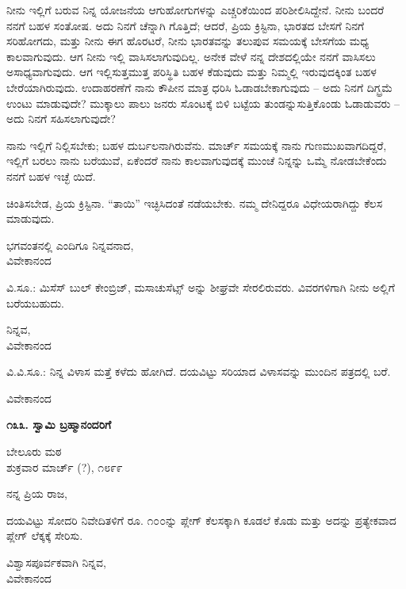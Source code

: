 ನೀನು ಇಲ್ಲಿಗೆ ಬರುವ ನಿನ್ನ ಯೋಜನೆಯ ಆಗುಹೋಗುಗಳನ್ನು ಎಚ್ಚರಿಕೆಯಿಂದ ಪರಿಶೀಲಿಸಿದ್ದೇನೆ. ನೀನು ಬಂದರೆ ನನಗೆ ಬಹಳ ಸಂತೋಷ. ಅದು ನಿನಗೆ ಚೆನ್ನಾಗಿ ಗೊತ್ತಿದೆ; ಆದರೆ, ಪ್ರಿಯ ಕ್ರಿಸ್ಟಿನಾ, ಭಾರತದ ಬೇಸಗೆ ನಿನಗೆ ಸರಿಹೋಗದು, ಮತ್ತು ನೀನು ಈಗ ಹೊರಟರೆ, ನೀನು ಭಾರತವನ್ನು ತಲುಪುವ ಸಮಯಕ್ಕೆ ಬೇಸಗೆಯ ಮಧ್ಯ ಕಾಲವಾಗುವುದು. ಆಗ ನೀನು ಇಲ್ಲಿ ವಾಸಿಸಲಾಗುವುದಿಲ್ಲ. ಅನೇಕ ವೇಳೆ ನನ್ನ ದೇಶದಲ್ಲಿಯೇ ನನಗೆ ವಾಸಿಸಲು ಅಸಾಧ್ಯವಾಗುವುದು. ಆಗ ಇಲ್ಲಿಸುತ್ತಮುತ್ತ ಪರಿಸ್ಥಿತಿ ಬಹಳ ಕೆಡುವುದು ಮತ್ತು ನಿಮ್ಮಲ್ಲಿ ಇರುವುದಕ್ಕಿಂತ ಬಹಳ ಬೇರೆಯಾಗಿರುವುದು. ಉದಾಹರಣೆಗೆ ನಾನು ಕೌಪೀನ ಮಾತ್ರ ಧರಿಸಿ ಓಡಾಡಬೇಕಾಗುವುದು – ಅದು ನಿನಗೆ ದಿಗ್ಭ್ರಮೆ ಉಂಟು ಮಾಡುವುದೇ? ಮುಕ್ಕಾಲು ಪಾಲು ಜನರು ಸೊಂಟಕ್ಕೆ ಬಿಳಿ ಬಟ್ಟೆಯ ತುಂಡನ್ನುಸುತ್ತಿಕೊಂಡು ಓಡಾಡುವರು – ಅದು ನಿನಗೆ ಸಹಿಸಲಾಗುವುದೇ?

ನಾನು ಇಲ್ಲಿಗೆ ನಿಲ್ಲಿಸಬೇಕು; ಬಹಳ ದುರ್ಬಲನಾಗಿರುವೆನು. ಮಾರ್ಚ್ ಸಮಯಕ್ಕೆ ನಾನು ಗುಣಮುಖವಾಗದಿದ್ದರೆ, ಇಲ್ಲಿಗೆ ಬರಲು ನಾನು ಬರೆಯುವೆ, ಏಕೆಂದರೆ ನಾನು ಕಾಲವಾಗುವುದಕ್ಕೆ ಮುಂಚೆ ನಿನ್ನನ್ನು ಒಮ್ಮೆ ನೋಡಬೇಕೆಂದು ನನಗೆ ಬಹಳ ಇಚ್ಛೆ ಯಿದೆ.

ಚಿಂತಿಸಬೇಡ, ಪ್ರಿಯ ಕ್ರಿಸ್ಟಿನಾ. “ತಾಯಿ” ಇಚ್ಛಿಸಿದಂತೆ ನಡೆಯಬೇಕು. ನಮ್ಮ ದೇನಿದ್ದರೂ ವಿಧೇಯರಾಗಿದ್ದು ಕೆಲಸ ಮಾಡುವುದು.

\begin{flushright}
ಭಗವಂತನಲ್ಲಿ ಎಂದಿಗೂ ನಿನ್ನವನಾದ,\\ವಿವೇಕಾನಂದ
\end{flushright}

ವಿ.ಸೂ.: ಮಿಸೆಸ್ ಬುಲ್ ಕೇಂಬ್ರಿಜ್, ಮಸಾಚುಸೆಟ್ಸ್ ಅನ್ನು ಶೀಘ್ರವೇ ಸೇರಲಿರುವರು. ವಿವರಗಳಿಗಾಗಿ ನೀನು ಅಲ್ಲಿಗೆ ಬರೆಯಬಹುದು.

\begin{flushright}
ನಿನ್ನವ,\\ವಿವೇಕಾನಂದ
\end{flushright}

ವಿ.ವಿ.ಸೂ.: ನಿನ್ನ ವಿಳಾಸ ಮತ್ತೆ ಕಳೆದು ಹೋಗಿದೆ. ದಯವಿಟ್ಟು ಸರಿಯಾದ ವಿಳಾಸವನ್ನು ಮುಂದಿನ ಪತ್ರದಲ್ಲಿ ಬರೆ.

\begin{flushright}
ವಿವೇಕಾನಂದ
\end{flushright}

\begin{center}
\textbf{೧೩೩. ಸ್ವಾಮಿ ಬ್ರಹ್ಮಾನಂದರಿಗೆ}
\end{center}

\begin{flushright}
ಬೇಲೂರು ಮಠ\\ಶುಕ್ರವಾರ ಮಾರ್ಚ್ (?), ೧೮೯೯
\end{flushright}

ನನ್ನ ಪ್ರಿಯ ರಾಜ,

ದಯವಿಟ್ಟು ಸೋದರಿ ನಿವೇದಿತಳಿಗೆ ರೂ. ೧೦೦ನ್ನು ಪ್ಲೇಗ್ ಕೆಲಸಕ್ಕಾಗಿ ಕೂಡಲೆ ಕೊಡು ಮತ್ತು ಅದನ್ನು ಪ್ರತ್ಯೇಕವಾದ ಪ್ಲೇಗ್ ಲೆಕ್ಕಕ್ಕೆ ಸೇರಿಸು.

\begin{flushright}
ವಿಶ್ವಾಸಪೂರ್ವಕವಾಗಿ ನಿನ್ನವ,\\ವಿವೇಕಾನಂದ
\end{flushright}

